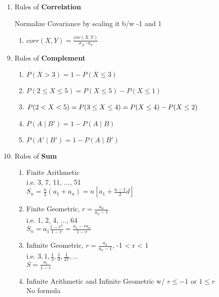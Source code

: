 \documentclass{article}
\begin{document}
\begin{small}
\begin{multicols}{2}
\begin{enumerate}
\item Rules of \textbf{Correlation}

Normalize Covariance by scaling it b/w -1 and 1

  \begin{enumerate}
  \item $corr(X, Y) = \frac{cov(X, Y)}{\sigma_X \cdot \sigma_Y}$
  \end{enumerate}

\end{enumerate}

\columnbreak
\begin{enumerate}
  \setcounter{enumi}{8}
  \item Rules of \textbf{Complement}
  \begin{enumerate}
  \item $P(X > 3) = 1 - P(X \le 3)$
  \item $P(2 \le X \le 5) = P(X \le 5) - P(X \le 1)$
  \item $P(2 < X < 5) \\= P(3 \le X \le 4) = P(X \le 4) - P(X \le 2)$
  \item $P(A \mid B') = 1 - P(A \mid B)$
  \item $P(A' \mid B') = 1 - P(A \mid B')$
  \end{enumerate}
  
  \item Rules of \textbf{Sum}
  \begin{enumerate}
  \item Finite Arithmetic \\
        i.e. 3, 7, 11, ..., 51 \\
        $S_n = \frac{n}{2}(a_1 + a_n) = n[a_1 + \frac{n-1}{2}d]$
  \item Finite Geometric, $r = \frac{a_n}{a_n - 1}$ \\
        i.e. 1, 2, 4, ..., 64 \\
        $S_n = a_1 \frac{1 - r^n}{1 - r} = \frac{a_1 - ra_n}{1 - r}$
  \item Infinite Geometric, $r = \frac{a_n}{a_n - 1}$, -1 < r < 1\\
        i.e. $3, 1, \frac{1}{3}, \frac{1}{9}, \frac{1}{27}, ...$ \\
        $S = \frac{a_1}{1 - r}$
  \item Infinite Arithmetic and Infinite Geometric w/ $r \le -1$ or $1 \le r$ \\
        No formula
  \end{enumerate}
  

\end{enumerate}
\end{multicols}
\end{small}
\end{document}
